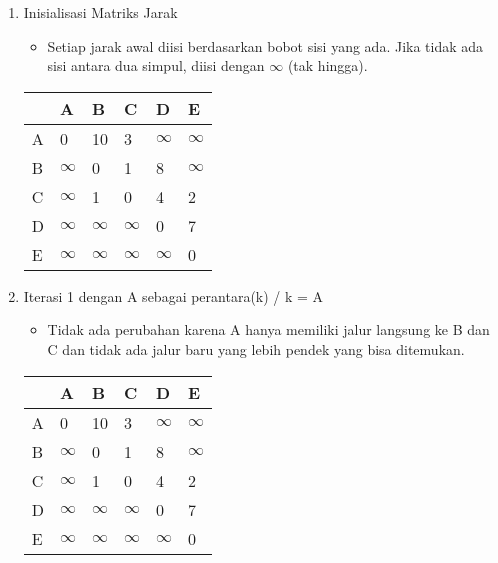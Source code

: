 \begin{enumerate}
    \item Inisialisasi Matriks Jarak
    \begin{itemize}
        \item Setiap jarak awal diisi berdasarkan bobot sisi yang ada. Jika tidak ada sisi antara dua simpul, diisi dengan $\infty$ (tak hingga).
    \end{itemize}
    \begin{table}[H]
        \begin{tabular}{|l|l|l|l|l|l|}
        \hline
          & A        & B        & C        & D        & E        \\ \hline
        A & 0        & 10       & 3        & $\infty$ & $\infty$ \\ \hline
        B & $\infty$ & 0        & 1        & 8        & $\infty$ \\ \hline
        C & $\infty$ & 1        & 0        & 4        & 2        \\ \hline
        D & $\infty$ & $\infty$ & $\infty$ & 0        & 7        \\ \hline
        E & $\infty$ & $\infty$ & $\infty$ & $\infty$ & 0        \\ \hline
        \end{tabular}
    \end{table}

    \item Iterasi 1 dengan A sebagai perantara(k) / k = A
    \begin{itemize}
        \item Tidak ada perubahan karena A hanya memiliki jalur langsung ke B dan C dan tidak ada jalur baru yang lebih pendek yang bisa ditemukan.
    \end{itemize}
    \begin{table}[H]
        \begin{tabular}{|l|l|l|l|l|l|}
        \hline
          & A        & B        & C        & D        & E        \\ \hline
        A & 0        & 10       & 3        & $\infty$ & $\infty$ \\ \hline
        B & $\infty$ & 0        & 1        & 8        & $\infty$ \\ \hline
        C & $\infty$ & 1        & 0        & 4        & 2        \\ \hline
        D & $\infty$ & $\infty$ & $\infty$ & 0        & 7        \\ \hline
        E & $\infty$ & $\infty$ & $\infty$ & $\infty$ & 0        \\ \hline
        \end{tabular}
    \end{table}


\end{enumerate}
